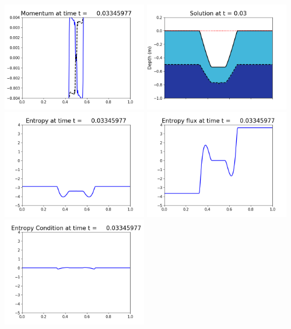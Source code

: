 \documentclass[11pt]{article}
\begin{document}
\vskip 10pt 
\includegraphics[width=0.475\textwidth]{frame0096fig1003.png}
\includegraphics[width=0.475\textwidth]{frame0096fig1006.png}
\vskip 10pt 
\includegraphics[width=0.475\textwidth]{frame0096fig1007.png}
\includegraphics[width=0.475\textwidth]{frame0096fig1008.png}
\vskip 10pt 
\includegraphics[width=0.475\textwidth]{frame0096fig1009.png}
\end{document}
